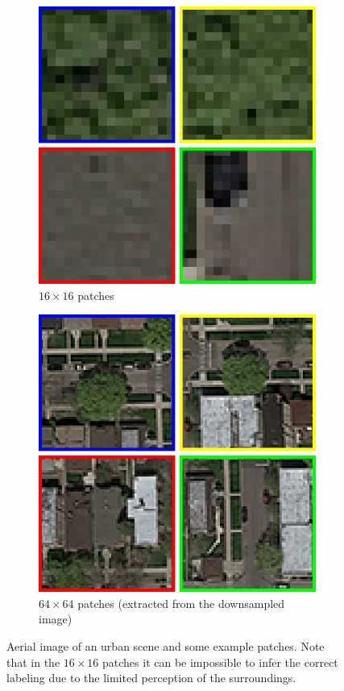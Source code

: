 \documentclass[10pt,conference,compsocconf]{IEEEtran}
\begin{document}
\begin{figure}
\begin{subfigure}[t]{.15\textwidth}
		\includegraphics[width=1\textwidth]{figs/context_size/context16}
		\caption{$ 16 \times 16 $ patches}
	\end{subfigure}
	\begin{subfigure}[t]{.15\textwidth}
		\includegraphics[width=1\textwidth]{figs/context_size/context64_ds}
		\caption{$ 64 \times 64 $ patches (extracted from the downsampled image)}
	\end{subfigure}
	\caption{Aerial image of an urban scene and some example patches. Note that in the $ 16 \times 16 $ patches it can be impossible to infer the correct labeling due to the limited perception of the surroundings.}
	\label{fig:context_size}
\end{figure}
\end{document}
